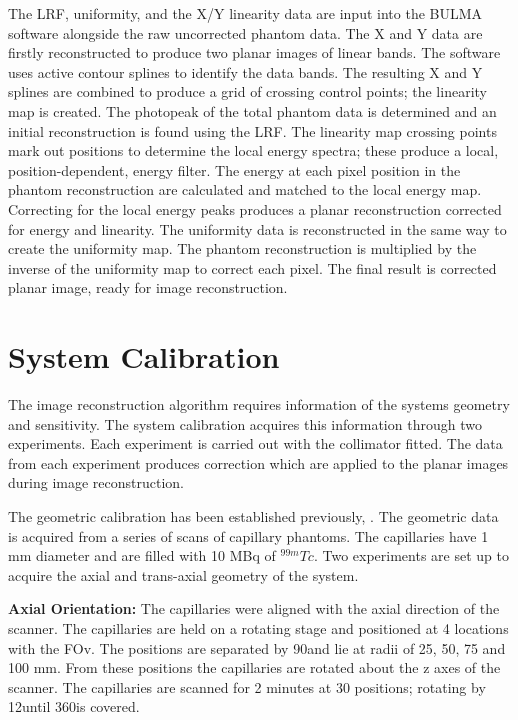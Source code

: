 The \acrshort{LRF}, uniformity, and the X/Y linearity data are input into the BULMA software alongside the raw uncorrected phantom data. The X and Y data are firstly reconstructed to produce two planar images of linear bands. The software uses active contour splines to identify the data bands. The resulting X and Y splines are combined to produce a grid of crossing control points; the linearity map is created. The photopeak of the total phantom data is determined and an initial reconstruction is found using the \acrshort{LRF}. The linearity map crossing points mark out positions to determine the local energy spectra; these produce a local, position-dependent, energy filter. The energy at each pixel position in the phantom reconstruction are calculated and matched to the local energy map. Correcting for the local energy peaks produces a planar reconstruction corrected for energy and linearity. The uniformity data is reconstructed in the same way to create the uniformity map. The phantom reconstruction is multiplied by the inverse of the uniformity map to correct each pixel. The final result is corrected planar image, ready for image reconstruction. 


\section{System Calibration}
The image reconstruction algorithm requires information of the systems geometry and sensitivity. The system calibration acquires this information through two experiments. Each experiment is carried out with the collimator fitted. The data from each experiment produces correction which are applied to the planar images during image reconstruction. 
 
The geometric calibration has been established previously, \cite{8340862}. The geometric data is acquired from a series of scans of capillary phantoms. The capillaries have 1 mm diameter and are filled with 10 MBq of $^{99m}Tc$. Two experiments are set up to acquire the axial and trans-axial geometry of the system. 

\textbf{Axial Orientation:} The capillaries were aligned with the axial direction of the scanner. The capillaries are held on a rotating stage and positioned at 4 locations with the \acrshort{FOv}. The positions are separated by 90\degree and lie at radii of 25, 50, 75 and 100 mm. From these positions the capillaries are rotated about the z axes of the scanner. The capillaries are scanned for 2 minutes at 30 positions; rotating by 12\degree until 360\degree is covered. 

